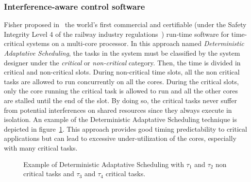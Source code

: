 \documentclass[main.tex]{subfiles}
\begin{document}
\subsubsection{Interference-aware control software}
Fisher proposed in~\cite{FisherWP} the world's first commercial and certifiable (under the Safety Integrity Level 4 of the railway industry regulations~\cite{IEC61508}) run-time software for time-critical systems on a multi-core processor. In this approach named \emph{Deterministic Adaptative Scheduling}, the tasks in the system must be classified by the system designer under the \emph{critical} or \emph{non-critical} category. Then, the time is divided in critical and non-critical slots. During non-critical time slots, all the non critical tasks are allowed to run concurrently on all the cores. During the critical slots, only the core running the critical task is allowed to run and all the other cores are stalled until the end of the slot. By doing so, the critical tasks never suffer from potential interferences on shared resources since they always execute in isolation. An example of the Deterministic Adaptative Scheduling technique is depicted in figure~\ref{fig_stateOfTheArt_DeterAdaptSched}. This approach provides good timing predictability to critical applications but can lead to excessive under-utilization of the cores, especially with many critical tasks.\\


\begin{figure}
    \centering
    
    \caption{Example of Deterministic Adaptative Scheduling with $\tau_1$ and $\tau_2$ non critical tasks and $\tau_3$ and $\tau_4$ critical tasks.}
    \label{fig_stateOfTheArt_DeterAdaptSched}
\end{figure}

\end{document}
